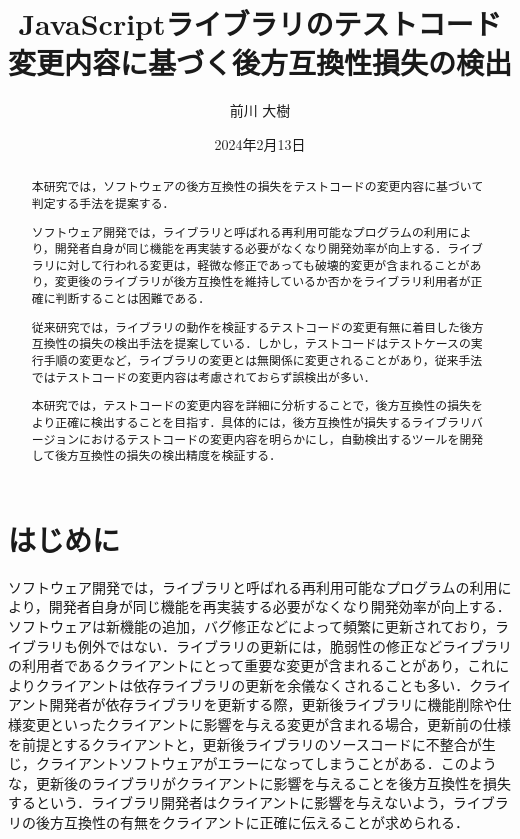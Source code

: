 \documentclass[11pt,dvipdfmx]{jreport}
\title{JavaScriptライブラリのテストコード変更内容に基づく後方互換性損失の検出}
\author{前川 大樹}
\date{2024年2月13日}	%
\begin{document}
\maketitle

\begin{abstract}
  本研究では，ソフトウェアの後方互換性の損失をテストコードの変更内容に基づいて判定する手法を提案する．

  ソフトウェア開発では，ライブラリと呼ばれる再利用可能なプログラムの利用により，開発者自身が同じ機能を再実装する必要がなくなり開発効率が向上する．ライブラリに対して行われる変更は，軽微な修正であっても破壊的変更が含まれることがあり，変更後のライブラリが後方互換性を維持しているか否かをライブラリ利用者が正確に判断することは困難である．

  従来研究では，ライブラリの動作を検証するテストコードの変更有無に着目した後方互換性の損失の検出手法を提案している．しかし，テストコードはテストケースの実行手順の変更など，ライブラリの変更とは無関係に変更されることがあり，従来手法ではテストコードの変更内容は考慮されておらず誤検出が多い．

  本研究では，テストコードの変更内容を詳細に分析することで，後方互換性の損失をより正確に検出することを目指す．具体的には，後方互換性が損失するライブラリバージョンにおけるテストコードの変更内容を明らかにし，自動検出するツールを開発して後方互換性の損失の検出精度を検証する．

\end{abstract}

\tableofcontents



\newpage
{}	%



\chapter{はじめに}
ソフトウェア開発では，ライブラリと呼ばれる再利用可能なプログラムの利用により，開発者自身が同じ機能を再実装する必要がなくなり開発効率が向上する\cite{shared-software}\cite{effect-on-developer}．ソフトウェアは新機能の追加，バグ修正などによって頻繁に更新されており，ライブラリも例外ではない\cite{library-analysis}．ライブラリの更新には，脆弱性の修正などライブラリの利用者であるクライアントにとって重要な変更が含まれることがあり，これによりクライアントは依存ライブラリの更新を余儀なくされることも多い．クライアント開発者が依存ライブラリを更新する際，更新後ライブラリに機能削除や仕様変更といったクライアントに影響を与える変更が含まれる場合，更新前の仕様を前提とするクライアントと，更新後ライブラリのソースコードに不整合が生じ，クライアントソフトウェアがエラーになってしまうことがある．このような，更新後のライブラリがクライアントに影響を与えることを後方互換性を損失するという．ライブラリ開発者はクライアントに影響を与えないよう，ライブラリの後方互換性の有無をクライアントに正確に伝えることが求められる．
\end{document}
